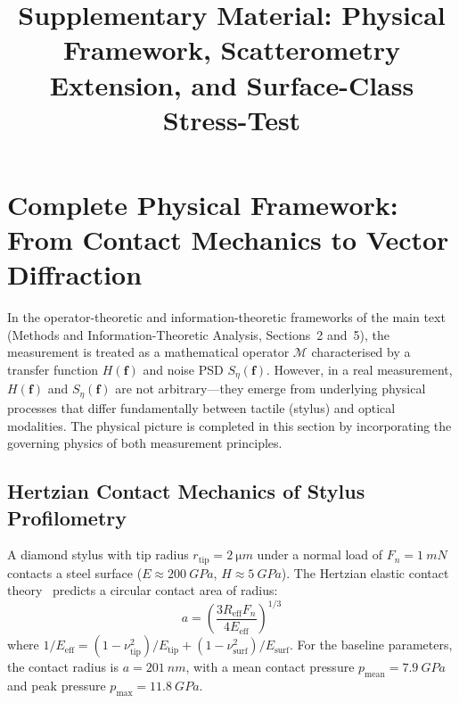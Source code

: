 \documentclass[review,12pt]{elsarticle}
\begin{document}
\title{Supplementary Material: Physical Framework, Scatterometry Extension, and Surface-Class Stress-Test}


\maketitle

\linenumbers


\section{Complete Physical Framework: From Contact Mechanics to Vector Diffraction}
\label{sec:physics}

In the operator-theoretic and information-theoretic frameworks of the main text (Methods and Information-Theoretic Analysis, Sections~2 and~5), the measurement is treated as a mathematical operator $\mathcal{M}$ characterised by a transfer function $H(\mathbf{f})$ and noise PSD $S_\eta(\mathbf{f})$. However, in a real measurement, $H(\mathbf{f})$ and $S_\eta(\mathbf{f})$ are not arbitrary---they emerge from underlying physical processes that differ fundamentally between tactile (stylus) and optical modalities. The physical picture is completed in this section by incorporating the governing physics of both measurement principles.

\subsection{Hertzian Contact Mechanics of Stylus Profilometry}

A diamond stylus with tip radius $r_\mathrm{tip} = \SI{2}{\micro m}$ under a normal load of $F_n = \SI{1}{mN}$ contacts a steel surface ($E \approx \SI{200}{GPa}$, $H \approx \SI{5}{GPa}$). The Hertzian elastic contact theory~\cite{johnson1985contact} predicts a circular contact area of radius:
\begin{equation}
    a = \left(\frac{3 R_\mathrm{eff} F_n}{4 E_\mathrm{eff}}\right)^{1/3}
    \label{eq:hertz}
\end{equation}
where $1/E_\mathrm{eff} = (1-\nu_\mathrm{tip}^2)/E_\mathrm{tip} + (1-\nu_\mathrm{surf}^2)/E_\mathrm{surf}$. For the baseline parameters, the contact radius is $a = \SI{201}{nm}$, with a mean contact pressure $p_\mathrm{mean} = \SI{7.9}{GPa}$ and peak pressure $p_\mathrm{max} = \SI{11.8}{GPa}$.
\end{document}
